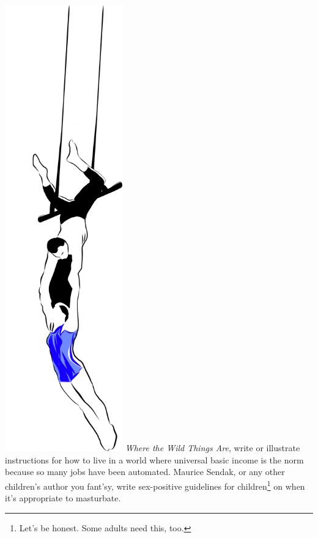 \hfill\includegraphics[width=2in]{images/duo_trapeze.pdf}
\newpage
\bversenonum {} \textit{Where the Wild Things Are}, write or illustrate instructions for how to live in a world where universal basic income is the norm because so many jobs have been automated.
\bversenonum {} Maurice Sendak, or any other children's author you fant'sy, write sex-positive guidelines for children\footnote{Let's be honest. Some adults need this, too.} on when it's appropriate to masturbate.
\newpage
